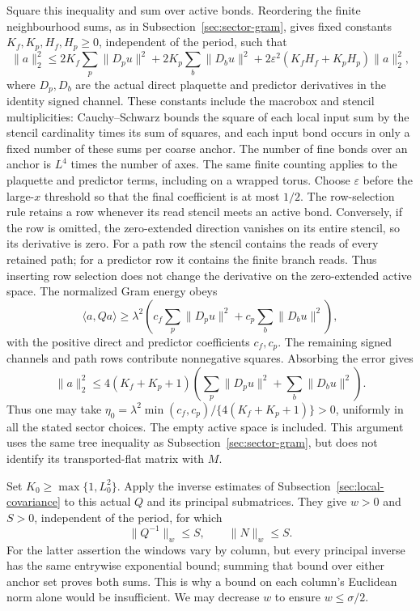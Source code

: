 Square this inequality and sum over active bonds. Reordering the finite
neighbourhood sums, as in Subsection~\ref{sec:sector-gram}, gives fixed
constants $K_f,K_p,H_f,H_p\ge0$, independent of the period, such that
\[
 \|a\|_2^2\le
 2K_f\sum_p\|D_pu\|^2+2K_p\sum_b\|D_bu\|^2
       +2\varepsilon^2(K_fH_f+K_pH_p)\|a\|_2^2,
\]
where $D_p,D_b$ are the actual direct plaquette and predictor
derivatives in the identity signed channel. These constants include
the macrobox and stencil multiplicities: Cauchy--Schwarz bounds the
square of each local input sum by the stencil cardinality times its
sum of squares, and each input bond occurs in only a fixed number of
these sums per coarse anchor. The number of fine bonds over an anchor
is $L^4$ times the number of axes. The same finite counting applies to
the plaquette and predictor terms, including on a wrapped torus.
Choose $\varepsilon$ before
the large-$x$ threshold so that the final coefficient is at most
$1/2$. The row-selection rule retains a row whenever its read stencil
meets an active bond. Conversely, if the row is omitted, the
zero-extended direction vanishes on its entire stencil, so its
derivative is zero. For a path row the stencil contains the reads of
every retained path; for a predictor row it contains the finite branch
reads. Thus inserting row selection does not change the derivative on
the zero-extended active space. The normalized Gram energy obeys
\[
 \langle a,Qa\rangle\ge\lambda^2\left(
 c_f\sum_p\|D_pu\|^2+c_p\sum_b\|D_bu\|^2\right),
\]
with the positive direct and predictor coefficients $c_f,c_p$.
The remaining signed channels and path rows contribute nonnegative
squares. Absorbing the error gives
\[
 \|a\|_2^2\le4(K_f+K_p+1)
  \left(\sum_p\|D_pu\|^2+\sum_b\|D_bu\|^2\right).
\]
Thus one may take
$\eta_0=\lambda^2\min(c_f,c_p)/\{4(K_f+K_p+1)\}>0$,
uniformly in all the stated sector choices. The empty active space is
included. This argument uses
the same tree inequality as Subsection~\ref{sec:sector-gram}, but does not
identify its transported-flat matrix with $M$.

Set $K_0\ge\max\{1,L_0^2\}$. Apply the inverse estimates of
Subsection~\ref{sec:local-covariance} to this actual $Q$ and its principal
submatrices. They give $w>0$ and $S>0$, independent of the period,
for which
\[
                \|Q^{-1}\|_w\le S,\qquad \|N\|_w\le S.
\]
For the latter assertion the windows vary by column, but every
principal inverse has the same entrywise exponential bound; summing
that bound over either anchor set proves both sums. This is why a
bound on each column's Euclidean norm alone would be insufficient.
We may decrease $w$ to ensure $w\le\sigma/2$.

